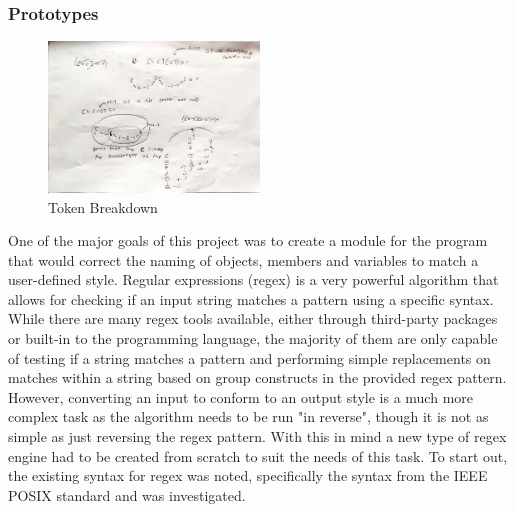 \subsubsection{Prototypes}

\begin{figure}
    \centering
    \caption{Token Breakdown}
    \label{fig:TokenBreakdown}
    \includegraphics[angle=90,width=0.5\textwidth]{Figures/TokenBreakdown.jpg}
\end{figure}
One of the major goals of this project was to create a module for the program that would correct the naming of objects, members and variables to match a user-defined style. Regular expressions (regex) is a very powerful algorithm that allows for checking if an input string matches a pattern using a specific syntax. While there are many regex tools available, either through third-party packages or built-in to the programming language, the majority of them are only capable of testing if a string matches a pattern and performing simple replacements on matches within a string based on group constructs in the provided regex pattern. However, converting an input to conform to an output style is a much more complex task as the algorithm needs to be run "in reverse", though it is not as simple as just reversing the regex pattern. With this in mind a new type of regex engine had to be created from scratch to suit the needs of this task.
To start out, the existing syntax for regex was noted, specifically the syntax from the IEEE POSIX standard \citep*{enwiki:1218131380} and was investigated.
